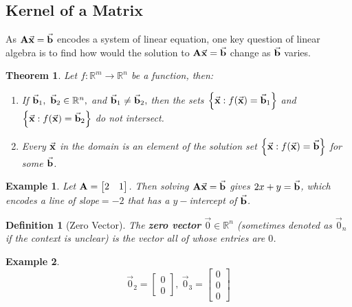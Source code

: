 \documentclass[12pt, a4paper]{article}
\newtheorem{thm}{Theorem}[subsection]
\newtheorem{df}{Definition}[subsection]
\newtheorem{eg}{Example}[subsection]
\def\R{{\mathbb{R}}}
\def\vecx{\va{x}}
\def\vecb{\va{b}}
\def\matrixA{\vb{A}}
\begin{document}
\subsection{Kernel of a Matrix}

As $\matrixA\vecx=\vecb$ encodes a system of linear equation, one key question of linear algebra is to find how would the solution to $\matrixA\vecx=\vecb$ change as $\vecb$ varies. 

\begin{thm}
	Let $f:\R^m\to\R^n$ be a function, then: 
	\begin{enumerate}
		\item If $\vecb_1,\ \vecb_2\in\R^n,$ and $\vecb_1\neq\vecb_2,$ then the sets $\left\{\vecx: f(\vecx)=\vecb_1\right\}$ and $\left\{\vecx: f(\vecx)=\vecb_2\right\}$ do not intersect. 
		\item Every $\vecx$ in the domain is an element of the solution set $\left\{\vecx: f(\vecx)=\vecb\right\}$ for some $\vecb$.
	\end{enumerate}
\end{thm}
\begin{eg}
	Let $\matrixA=\begin{bmatrix}2&1\end{bmatrix}$. Then solving $\matrixA\vecx=\vecb$ gives $2x+y=\vecb$, which encodes a line of slope$=-2$ that has a $y-$intercept of $\vecb$.	
\end{eg}
\begin{df}[Zero Vector]
	The \textbf{zero vector} $\vec{0}\in\R^n$ (sometimes denoted as $\vec{0}_n$ if the context is unclear) is the vector all of whose entries are $0$.
\end{df}
\begin{eg}
	\[\vec{0}_2=\begin{bmatrix}0\\0	\end{bmatrix},\ \vec{0}_3=\begin{bmatrix}0\\0\\0\end{bmatrix}\]	
\end{eg}
\end{document}
